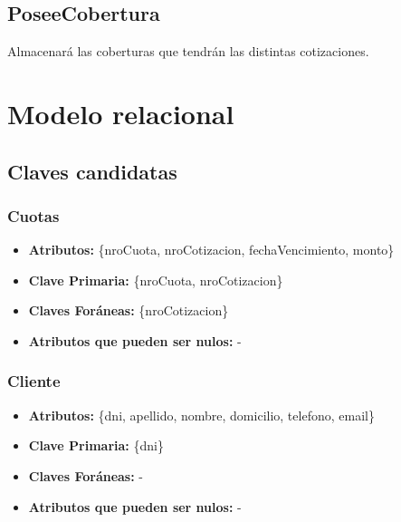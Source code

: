 \documentclass[a4paper,11pt]{article}
\begin{document}
\subsection{PoseeCobertura}

Almacenará las coberturas que tendrán las distintas cotizaciones.


\section{Modelo relacional}

\subsection{Claves candidatas}

\subsubsection{Cuotas}

\begin{itemize}

	\item \textbf{Atributos:} \{nroCuota, nroCotizacion, fechaVencimiento, monto\}

	\item \textbf{Clave Primaria:} \{nroCuota, nroCotizacion\}

	\item \textbf{Claves Foráneas:} \{nroCotizacion\}

	\item \textbf{Atributos que pueden ser nulos:} -
	
\end{itemize}

\subsubsection{Cliente}

\begin{itemize}

	\item \textbf{Atributos:} \{dni, apellido, nombre, domicilio, telefono, email\}

	\item \textbf{Clave Primaria:} \{dni\}

	\item \textbf{Claves Foráneas:} -

	\item \textbf{Atributos que pueden ser nulos:} -
	
\end{itemize}
\end{document}
